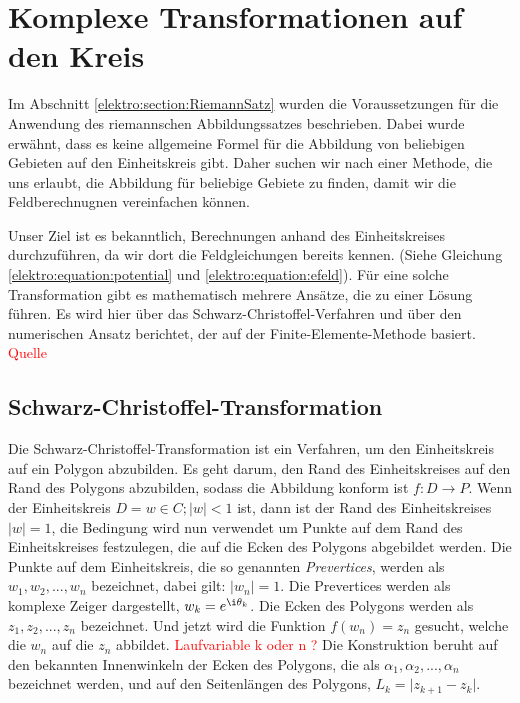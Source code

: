 %
%
%
%

\section{Komplexe Transformationen auf den Kreis
\label{elektro:section:KreisTrafo}}

Im Abschnitt \ref{elektro:section:RiemannSatz} wurden die Voraussetzungen für die Anwendung des riemannschen Abbildungssatzes beschrieben.
Dabei wurde erwähnt, dass es keine allgemeine Formel für die Abbildung von beliebigen Gebieten auf den Einheitskreis gibt.
Daher suchen wir nach einer Methode, die uns erlaubt, die Abbildung für beliebige Gebiete zu finden, damit wir die Feldberechnugnen vereinfachen können.

Unser Ziel ist es bekanntlich, Berechnungen anhand des Einheitskreises durchzuführen, da wir dort die Feldgleichungen bereits kennen. 
(Siehe Gleichung \eqref{elektro:equation:potential} und \eqref{elektro:equation:efeld}).
Für eine solche Transformation gibt es mathematisch mehrere Ansätze, die zu einer Lösung führen.
Es wird hier über das Schwarz-Christoffel-Verfahren und über den numerischen Ansatz berichtet, der auf der Finite-Elemente-Methode basiert.
\textcolor{red}{Quelle}


\subsection{Schwarz-Christoffel-Transformation
\label{elektro:section:SchwarzChristoffel}}
Die Schwarz-Christoffel-Transformation ist ein Verfahren, um den Einheitskreis auf ein Polygon abzubilden. 
Es geht darum, den Rand des Einheitskreises auf den Rand des Polygons abzubilden, sodass die Abbildung konform ist $f: D \rightarrow P $.
Wenn der Einheitskreis $D = {w \in C ; \vert w \vert < 1}$ ist, dann ist der Rand des Einheitskreises $\vert w \vert = 1$, die Bedingung wird nun verwendet um Punkte auf dem Rand des Einheitskreises festzulegen, die auf die Ecken des Polygons abgebildet werden.
Die Punkte auf dem Einheitskreis, die so genannten \emph{Prevertices}, werden als $w_1, w_2, ..., w_n$ bezeichnet, dabei gilt: $\vert w_n \vert = 1$.
Die Prevertices werden als komplexe Zeiger dargestellt, $w_k = e^{\i \theta_k} $.
Die Ecken des Polygons werden als $z_1, z_2, ..., z_n$ bezeichnet.
Und jetzt wird die Funktion $f(w_n) = z_n$ gesucht, welche die $w_n$ auf die $z_n$ abbildet. \textcolor{red}{Laufvariable k oder n ?}
Die Konstruktion beruht auf den bekannten Innenwinkeln der Ecken des Polygons, die als $\alpha_1, \alpha_2, ..., \alpha_n$ bezeichnet werden, und auf den Seitenlängen des Polygons, $L_k = \vert z_{k+1} - z_k \vert$.

